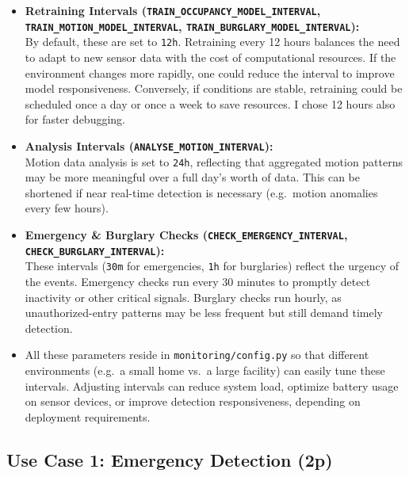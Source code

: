 \documentclass[A4,10pt]{article}
\begin{document}
\begin{itemize}
    \item \textbf{Retraining Intervals (\texttt{TRAIN\_OCCUPANCY\_MODEL\_INTERVAL}, \texttt{TRAIN\_MOTION\_MODEL\_INTERVAL}, \texttt{TRAIN\_BURGLARY\_MODEL\_INTERVAL}):}\\
    By default, these are set to \texttt{12h}. Retraining every 12 hours balances the need to adapt to new sensor data with the cost of computational resources. If the environment changes more rapidly, one could reduce the interval to improve model responsiveness. Conversely, if conditions are stable, retraining could be scheduled once a day or once a week to save resources. I chose 12 hours also for faster debugging.

    \item \textbf{Analysis Intervals (\texttt{ANALYSE\_MOTION\_INTERVAL}):}\\
    Motion data analysis is set to \texttt{24h}, reflecting that aggregated motion patterns may be more meaningful over a full day’s worth of data. This can be shortened if near real-time detection is necessary (e.g.\ motion anomalies every few hours).

    \item \textbf{Emergency \& Burglary Checks (\texttt{CHECK\_EMERGENCY\_INTERVAL}, \texttt{CHECK\_BURGLARY\_INTERVAL}):}\\
    These intervals (\texttt{30m} for emergencies, \texttt{1h} for burglaries) reflect the urgency of the events. Emergency checks run every 30 minutes to promptly detect inactivity or other critical signals. Burglary checks run hourly, as unauthorized-entry patterns may be less frequent but still demand timely detection.

    \item All these parameters reside in \texttt{monitoring/config.py} so that different environments (e.g.\ a small home vs.\ a large facility) can easily tune these intervals. Adjusting intervals can reduce system load, optimize battery usage on sensor devices, or improve detection responsiveness, depending on deployment requirements.
\end{itemize}


\subsection{Use Case 1: Emergency Detection (2p)}
\label{sec:use_case_emergency_detection}
\end{document}
